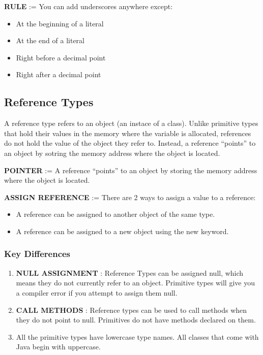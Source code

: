 \documentclass{article}
\begin{document}
\textbf{RULE} := You can add underscores anywhere except:
\begin{itemize}
	\item At the beginning of a literal
	\item At the end of a literal
	\item Right before a decimal point
	\item Right after a decimal point
\end{itemize}

\subsection{Reference Types}

A reference type refers to an object (an instace of a class). Unlike primitive types that hold their values in the memory where the variable is allocated, references do not hold the value of the object they refer to. Instead, a reference ``points'' to an object by sotring the memory address where the object is located.

\textbf{POINTER} := A reference ``points'' to an object by storing the memory address where the object is located.

\textbf{ASSIGN REFERENCE} := There are 2 ways to assign a value to a reference:
\begin{itemize}
	\item A reference can be assigned to another object of the same type.
	\item A reference can be assigned to a new object using the new keyword.
\end{itemize}

\subsubsection{Key Differences}
\begin{enumerate}
	\item\textbf{NULL ASSIGNMENT} : Reference Types can be assigned null, which means they do not currently refer to an object. Primitive types will give you a compiler error if you attempt to assign them null.

	\item\textbf{CALL METHODS} : Reference types can be used to call methods when they do not point to null. Primitives do not have methods declared on them.
	\item All the primitive types have lowercase type names. All classes that come with Java begin with uppercase.
\end{enumerate}
\end{document}
